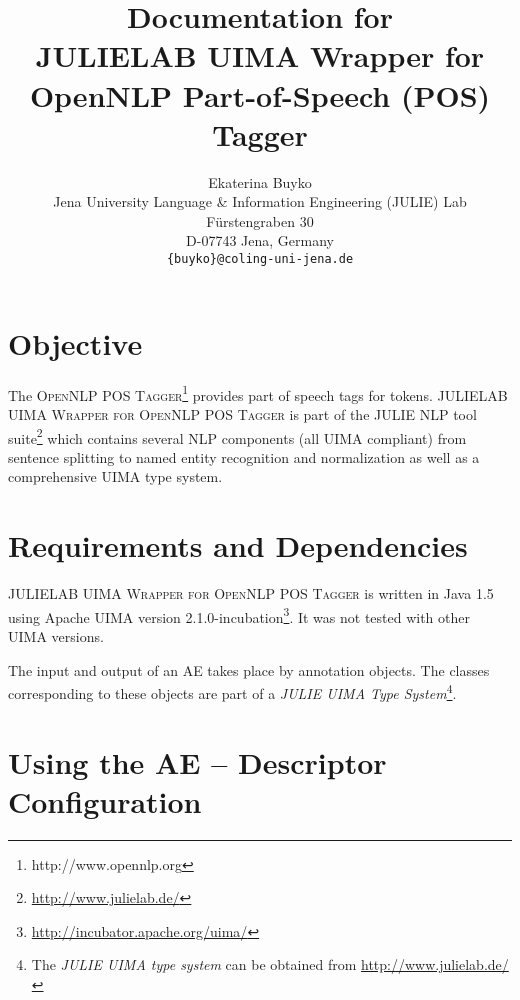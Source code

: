 \documentclass[11pt,a4paper,halfparskip]{scrartcl}
\title{\small{Documentation for}\\\huge JULIELAB UIMA Wrapper for \\OpenNLP Part-of-Speech (POS)
Tagger}
\author{\normalsize Ekaterina Buyko\\
  \normalsize  Jena University Language \& Information Engineering (JULIE) Lab\\
  \normalsize F\"urstengraben 30 \\
  \normalsize D-07743 Jena, Germany\\
  {\normalsize \tt \{buyko\}@coling-uni-jena.de} }
\date{}
\begin{document}
\maketitle

\section{Objective}



The \textsc{OpenNLP POS Tagger}\footnote{http://www.opennlp.org} provides part of speech tags for
tokens. \textsc{JULIELAB UIMA Wrapper for OpenNLP POS Tagger} is part of the JULIE NLP tool
suite\footnote{\url{http://www.julielab.de/}} which contains several NLP components (all UIMA
compliant) from sentence splitting to named
entity recognition and normalization as well as a comprehensive UIMA
type system.





\section{Requirements and Dependencies}

\textsc{JULIELAB UIMA Wrapper for OpenNLP POS Tagger} is written in Java 1.5 using Apache
UIMA version 2.1.0-incubation\footnote{\url{http://incubator.apache.org/uima/}}. It
was not tested with other UIMA versions.

The input and output of an AE takes place by annotation objects. The
classes corresponding to these objects are part of a \emph{JULIE UIMA
  Type System}\footnote{The \emph{JULIE UIMA type system} can be
  obtained from \url{http://www.julielab.de/}}.





\section{Using the AE -- Descriptor Configuration}
\end{document}
